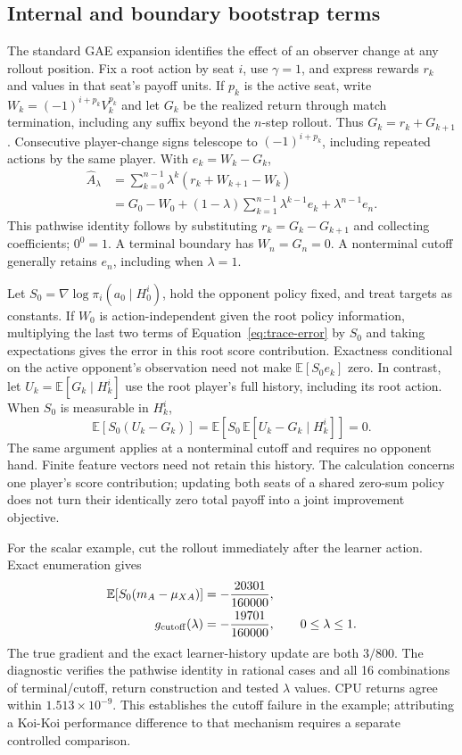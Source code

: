 \documentclass[11pt]{article}
\begin{document}
\subsection{Internal and boundary bootstrap terms}
\label{app:trace}
The standard GAE expansion \cite{schulman2015gae} identifies the effect of
an observer change at any rollout position. Fix a root action by seat $i$,
use $\gamma=1$, and express rewards $r_k$ and values in that seat's payoff
units. If $p_k$ is the active seat, write
$W_k=(-1)^{i+p_k}V_k^{p_k}$ and let $G_k$ be the realized return through match
termination, including any suffix beyond the $n$-step rollout. Thus
$G_k=r_k+G_{k+1}$. Consecutive player-change signs telescope to $(-1)^{i+p_k}$,
including repeated actions by the same player. With $e_k=W_k-G_k$,
\begin{align}
 \widehat A_\lambda
 &=\sum_{k=0}^{n-1}\lambda^k(r_k+W_{k+1}-W_k)\\
 &=G_0-W_0+(1-\lambda)\sum_{k=1}^{n-1}\lambda^{k-1}e_k
   +\lambda^{n-1}e_n.\label{eq:trace-error}
\end{align}
This pathwise identity follows by substituting $r_k=G_k-G_{k+1}$ and
collecting coefficients; $0^0=1$. A terminal boundary has $W_n=G_n=0$.
A nonterminal cutoff generally retains $e_n$, including when $\lambda=1$.

Let $S_0=\nabla\log\pi_i(a_0\mid H_0^i)$, hold the opponent policy fixed,
and treat targets as constants. If $W_0$ is action-independent given the
root policy information, multiplying the last two terms of
Equation~\ref{eq:trace-error} by $S_0$ and taking expectations gives the
error in this root score contribution. Exactness conditional on the active
opponent's observation need not make $\mathbb E[S_0e_k]$ zero. In contrast,
let $U_k=\mathbb E[G_k\mid H_k^i]$ use the root player's full history,
including its root action. When $S_0$ is measurable in $H_k^i$,
\begin{equation}
 \mathbb E[S_0(U_k-G_k)]
 =\mathbb E[S_0\,\mathbb E[U_k-G_k\mid H_k^i]]=0.
\end{equation}
The same argument applies at a nonterminal cutoff and requires no opponent
hand. Finite feature vectors need not retain this history. The calculation
concerns one player's score contribution; updating both seats of a shared
zero-sum policy does not turn their identically zero total payoff into a
joint improvement objective.

For the scalar example, cut the rollout immediately after the learner action.
Exact enumeration gives
\begin{align}
 \mathbb E[S_0(m_A-\mu_{XA})]&=-\frac{20301}{160000},\\
 g_{\rm cutoff}(\lambda)&=-\frac{19701}{160000},\qquad 0\leq\lambda\leq1.
\end{align}
The true gradient and the exact learner-history update are both $3/800$.
The diagnostic
 verifies the pathwise
identity in \TraceExactCases{} rational cases and all 16 combinations of
terminal/cutoff, return construction and tested $\lambda$ values. CPU returns
agree within $1.513\times10^{-9}$. This establishes the cutoff failure in the
example; attributing a Koi-Koi performance difference to that mechanism
requires a separate controlled comparison.
\end{document}
